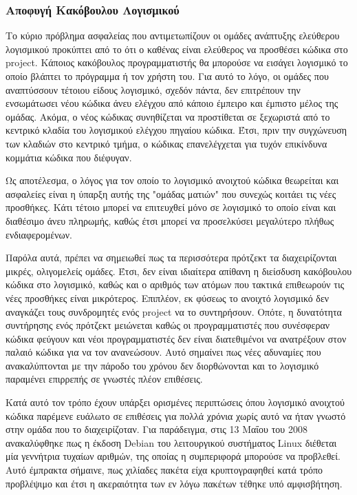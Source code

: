 \documentclass[a4paper, 11pt]{article}
\begin{document}
{{\subsubsection{Αποφυγή Κακόβουλου Λογισμικού}

Το κύριο πρόβλημα ασφαλείας που αντιμετωπίζουν οι ομάδες ανάπτυξης ελεύθερου λογισμικού προκύπτει από το ότι ο καθένας είναι ελεύθερος να προσθέσει κώδικα στο \textlatin{project}. Κάποιος κακόβουλος προγραμματιστής θα μπορούσε να εισάγει λογισμικό το οποίο βλάπτει το πρόγραμμα ή τον χρήστη του. Για αυτό το λόγο, οι ομάδες που αναπτύσσουν τέτοιου είδους λογισμικό, σχεδόν πάντα, δεν επιτρέπουν την ενσωμάτωσει νέου κώδικα άνευ ελέγχου από κάποιο έμπειρο και έμπιστο μέλος της ομάδας. Ακόμα, ο νέος κώδικας συνηθίζεται να προστίθεται σε ξεχωριστά από το κεντρικό κλαδία του λογισμικού ελέγχου πηγαίου κώδικα. Έτσι, πριν την συγχώνευση των κλαδιών στο κεντρικό τμήμα, ο κώδικας επανελέγχεται για τυχόν επικίνδυνα κομμάτια κώδικα που διέφυγαν.

Ως αποτέλεσμα, ο λόγος για τον οποίο το λογισμικό ανοιχτού κώδικα θεωρείται και ασφαλείες είναι η ύπαρξη αυτής της "ομάδας ματιών" που συνεχώς κοιτάει τις νέες προσθήκες. Κάτι τέτοιο μπορεί να επιτευχθεί μόνο σε λογισμικό το οποίο είναι και διαθέσιμο άνευ πληρωμής, καθώς έτσι μπορεί να προσελκύσει μεγαλύτερο πλήθως ενδιαφερομένων.

Παρόλα αυτά, πρέπει να σημειωθεί πως τα περισσότερα πρότζεκτ τα διαχειρίζονται μικρές, ολιγομελείς ομάδες. Έτσι, δεν είναι ιδιαίτερα απίθανη η διείσδυση κακόβουλου κώδικα στο λογισμικό, καθώς και ο αριθμός των ατόμων που τακτικά επιθεωρούν τις νέες προσθήκες είναι μικρότερος. Επιπλέον, εκ φύσεως το ανοιχτό λογισμικό δεν αναγκάζει τους συνδρομητές ενός \textlatin{project} να το συντηρήσουν. Οπότε, η δυνατότητα συντήρησης ενός πρότζεκτ μειώνεται καθώς οι προγραμματιστές που συνέσφεραν κώδικα φεύγουν και νέοι προγραμματιστές δεν είναι διατεθιμένοι να ανατρέξουν στον παλαιό κώδικα για να τον ανανεώσουν. Αυτό σημαίνει πως νέες αδυναμίες που ανακαλύπτονται με την πάροδο του χρόνου δεν διορθώνονται και το λογισμικό παραμένει επιρρεπής σε γνωστές πλέον επιθέσεις.

Κατά αυτό τον τρόπο έχουν υπάρξει ορισμένες περιπτώσεις όπου λογισμικό ανοιχτού κώδικα παρέμενε ευάλωτο σε επιθέσεις για πολλά χρόνια χωρίς αυτό να ήταν γνωστό στην ομάδα που το διαχειρίζοταν. Για παράδειγμα, στις 13
Μαΐου του 2008 ανακαλύφθηκε πως η έκδοση \textlatin{Debian} του λειτουργικού συστήματος \textlatin{Linux} διέθεται μία γεννήτρια τυχαίων αριθμών, της οποίας η συμπεριφορά μπορούσε να προβλεθεί. Αυτό έμπρακτα σήμαινε, πως χιλίαδες πακέτα είχα κρυπτογραφηθεί κατά τρόπο προβλέψιμο και έτσι η ακεραιότητα των εν λόγω πακέτων τέθηκε υπό αμφισβήτηση.

}}
\end{document}
